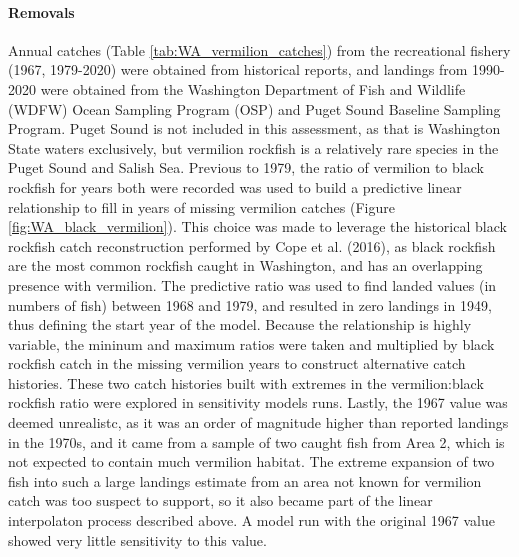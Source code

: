 \documentclass[11pt,
  english,
  a4paper,
]{article}
\begin{document}
\leavevmode\tagmcend\tagstructend


\hypertarget{removals}{%
\paragraph{Removals}\label{removals}}

\leavevmode\tagmcend\tagstructend


Annual catches (Table \ref{tab:WA_vermilion_catches}) from the recreational fishery (1967, 1979-2020) were obtained from historical reports, and landings from 1990-2020 were obtained from the Washington Department of Fish and Wildlife (WDFW) Ocean Sampling Program (OSP) and Puget Sound Baseline Sampling Program. Puget Sound is not included in this assessment, as that is Washington State waters exclusively, but vermilion rockfish is a relatively rare species in the Puget Sound and Salish Sea. Previous to 1979, the ratio of vermilion to black rockfish for years both were recorded was used to build a predictive linear relationship to fill in years of missing vermilion catches (Figure \ref{fig:WA_black_vermilion}). This choice was made to leverage the historical black rockfish catch reconstruction performed by Cope et al. {(2016)\leavevmode\tagmcend\tagstructend}, as black rockfish are the most common rockfish caught in Washington, and has an overlapping presence with vermilion. The predictive ratio was used to find landed values (in numbers of fish) between 1968 and 1979, and resulted in zero landings in 1949, thus defining the start year of the model. Because the relationship is highly variable, the mininum and maximum ratios were taken and multiplied by black rockfish catch in the missing vermilion years to construct alternative catch histories. These two catch histories built with extremes in the vermilion:black rockfish ratio were explored in sensitivity models runs. Lastly, the 1967 value was deemed unrealistc, as it was an order of magnitude higher than reported landings in the 1970s, and it came from a sample of two caught fish from Area 2, which is not expected to contain much vermilion habitat. The extreme expansion of two fish into such a large landings estimate from an area not known for vermilion catch was too suspect to support, so it also became part of the linear interpolaton process described above. A model run with the original 1967 value showed very little sensitivity to this value.
\end{document}
